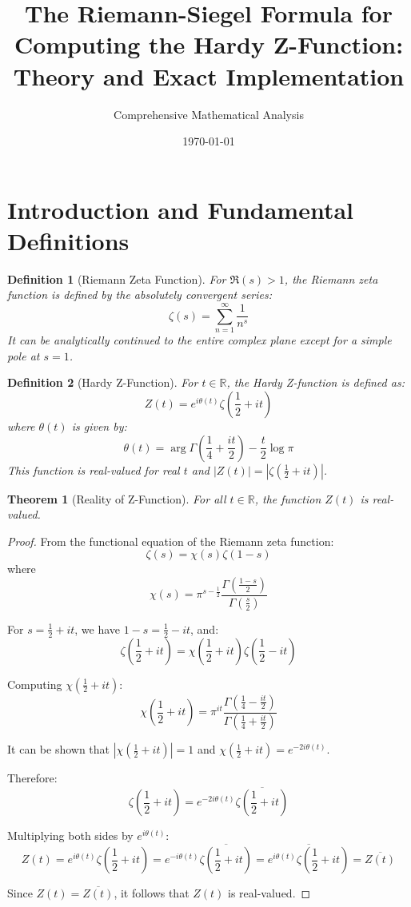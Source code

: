 \documentclass{article}
\title{The Riemann-Siegel Formula for Computing the Hardy Z-Function: \\ Theory and Exact Implementation}
\author{Comprehensive Mathematical Analysis}
\date{\today}
\newtheorem{theorem}{Theorem}
\newtheorem{definition}{Definition}
\begin{document}
\maketitle

\section{Introduction and Fundamental Definitions}

\begin{definition}[Riemann Zeta Function]
For $\Re(s) > 1$, the Riemann zeta function is defined by the absolutely convergent series:
\[
\zeta(s) = \sum_{n=1}^{\infty} \frac{1}{n^s}
\]
It can be analytically continued to the entire complex plane except for a simple pole at $s=1$.
\end{definition}

\begin{definition}[Hardy Z-Function]
For $t \in \mathbb{R}$, the Hardy Z-function is defined as:
\[
Z(t) = e^{i\theta(t)}\zeta\left(\frac{1}{2} + it\right)
\]
where $\theta(t)$ is given by:
\[
\theta(t) = \arg\Gamma\left(\frac{1}{4} + \frac{it}{2}\right) - \frac{t}{2}\log\pi
\]
This function is real-valued for real $t$ and $|Z(t)| = \left|\zeta\left(\frac{1}{2} + it\right)\right|$.
\end{definition}

\begin{theorem}[Reality of Z-Function]
For all $t \in \mathbb{R}$, the function $Z(t)$ is real-valued.
\end{theorem}

\begin{proof}
From the functional equation of the Riemann zeta function:
\[
\zeta(s) = \chi(s)\zeta(1-s)
\]
where 
\[
\chi(s) = \pi^{s-\frac{1}{2}}\frac{\Gamma\left(\frac{1-s}{2}\right)}{\Gamma\left(\frac{s}{2}\right)}
\]

For $s = \frac{1}{2} + it$, we have $1-s = \frac{1}{2} - it$, and:
\[
\zeta\left(\frac{1}{2}+it\right) = \chi\left(\frac{1}{2}+it\right)\zeta\left(\frac{1}{2}-it\right)
\]

Computing $\chi\left(\frac{1}{2}+it\right)$:
\[
\chi\left(\frac{1}{2}+it\right) = \pi^{it}\frac{\Gamma\left(\frac{1}{4}-\frac{it}{2}\right)}{\Gamma\left(\frac{1}{4}+\frac{it}{2}\right)}
\]

It can be shown that $|\chi\left(\frac{1}{2}+it\right)| = 1$ and $\chi\left(\frac{1}{2}+it\right) = e^{-2i\theta(t)}$.

Therefore:
\[
\zeta\left(\frac{1}{2}+it\right) = e^{-2i\theta(t)}\overline{\zeta\left(\frac{1}{2}+it\right)}
\]

Multiplying both sides by $e^{i\theta(t)}$:
\[
Z(t) = e^{i\theta(t)}\zeta\left(\frac{1}{2}+it\right) = e^{-i\theta(t)}\overline{\zeta\left(\frac{1}{2}+it\right)} = \overline{e^{i\theta(t)}\zeta\left(\frac{1}{2}+it\right)} = \overline{Z(t)}
\]

Since $Z(t) = \overline{Z(t)}$, it follows that $Z(t)$ is real-valued.
\end{proof}
\end{document}
